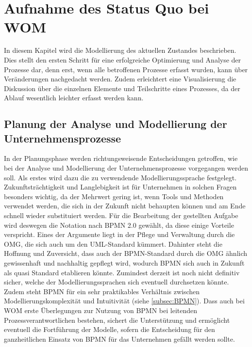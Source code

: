 \documentclass[a4paper,12pt]{report}
\begin{document}
\chapter{Aufnahme des Status Quo bei WOM}\label{chap:AufnahmeStatusQuo}
In diesem Kapitel wird die Modellierung des aktuellen Zustandes beschrieben. Dies stellt den ersten Schritt für eine erfolgreiche Optimierung und Analyse der Prozesse dar, denn erst, wenn alle betroffenen Prozesse erfasst wurden, kann über Veränderungen nachgedacht werden. Zudem erleichtert eine Visualisierung die Diskussion über die einzelnen Elemente und Teilschritte eines Prozesses, da der Ablauf wesentlich leichter erfasst werden kann.
\section{Planung der Analyse und Modellierung der Unternehmensprozesse}\label{sec:Planung}
In der Planungsphase werden richtungsweisende Entscheidungen getroffen, wie bei der Analyse und Modellierung der Unternehmensprozesse vorgegangen werden soll. Als erstes wird dazu die zu verwendende Modellierungssprache festgelegt. Zukunftsträchtigkeit und Langlebigkeit ist für Unternehmen in solchen Fragen besonders wichtig, da der Mehrwert gering ist, wenn Tools und Methoden verwendet werden, die sich in der Zukunft nicht behaupten können und am Ende schnell wieder substituiert werden. Für die Bearbeitung der gestellten Aufgabe wird deswegen die Notation nach BPMN 2.0 gewählt, da diese einige Vorteile verspricht. Eines der Argumente liegt in der Pflege und Verwaltung durch die \ac{OMG}, die sich auch um den UML-Standard kümmert. Dahinter steht die Hoffnung und Zuversicht, dass auch der BPMN-Standard durch die OMG ähnlich gewissenhaft und nachhaltig gepflegt wird, wodurch BPMN sich auch in Zukunft als quasi Standard etablieren könnte. Zumindest derzeit ist noch nicht definitiv sicher, welche der Modellierungssprachen sich eventuell durchsetzen könnte. Zudem steht BPMN für ein sehr praktikables Verhältnis zwischen Modellierungskomplexität und Intuitivität (siehe \ref{subsec:BPMN}). Dass auch bei WOM erste Überlegungen zur Nutzung von BPMN bei leitenden Prozessverantwortlichen bestehen, sichert die Unterstützung und ermöglicht eventuell die Fortführung der Modelle, sofern die Entscheidung für den ganzheitlichen Einsatz von BPMN für das Unternehmen gefällt werden sollte.
\end{document}
